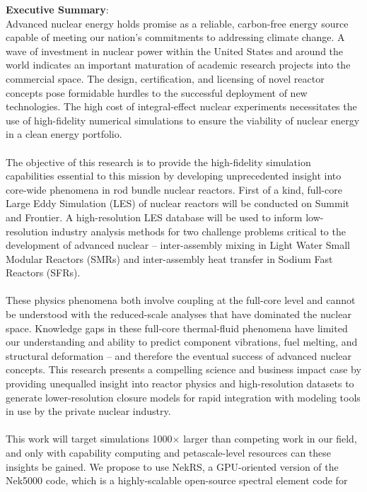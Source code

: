 \documentclass[11pt,letterpaper,english]{article}
\begin{document}
\textbf{Executive Summary}: \\
\justify
Advanced nuclear energy holds promise as a reliable, carbon-free energy source capable of
meeting our nation's commitments to addressing climate change. A wave of investment in nuclear
power within the United States and around the world indicates an important maturation of
academic research projects into the commercial space. The design, certification, and licensing
of novel reactor concepts pose formidable hurdles to the successful deployment of new technologies.
The high cost of integral-effect nuclear experiments necessitates
the use of high-fidelity numerical simulations to ensure the viability of nuclear energy
in a clean energy portfolio.\\
\\
The objective of this research is to provide the high-fidelity simulation capabilities essential
to this mission by developing unprecedented insight into core-wide phenomena in rod
bundle nuclear reactors. First of a kind, full-core Large Eddy Simulation (LES) of nuclear reactors will be
conducted on Summit and Frontier.
A high-resolution LES database will be used to inform low-resolution industry analysis
methods for two challenge problems critical to the development of advanced nuclear --
inter-assembly mixing in Light Water Small Modular Reactors (SMRs) and
inter-assembly heat transfer in Sodium Fast Reactors (SFRs).\\
\\
These physics phenomena
both involve coupling at the full-core level and cannot be understood
with the reduced-scale analyses that have dominated the nuclear space.
Knowledge gaps in these full-core thermal-fluid phenomena have limited
our understanding and ability to predict component vibrations, fuel melting, and
structural deformation -- and therefore the eventual success of advanced nuclear concepts.
This research presents a compelling science and business impact case
by providing unequalled insight into reactor physics and
high-resolution datasets to generate lower-resolution closure models
for rapid integration with modeling tools in use by the private nuclear industry.\\
\\
This work will target simulations 1000\(\times\) larger than competing work in our field, and only
with capability computing and petascale-level resources can these insights be gained.
We propose to use NekRS, a GPU-oriented version of the Nek5000 code, which is
a highly-scalable open-source spectral element code for
\end{document}
